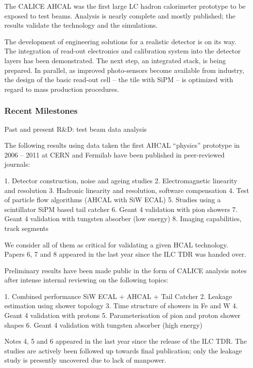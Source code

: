 The CALICE AHCAL was the first large LC hadron calorimeter prototype to be exposed to test beams. Analysis is nearly complete and mostly published; the results validate the technology and the simulations. 

The development of engineering solutions for a realistic detector is on its way. The integration of read-out electronics and calibration system into the detector layers has been demonstrated. The next step, an integrated stack, is being prepared. In parallel, as improved photo-sensors become available from industry, the design of the basic read-out cell -- the tile with SiPM -- is optimized with regard to mass production procedures. 

\subsubsection{Recent Milestones}
Past and present R\&D: test beam data analysis

The following results using data taken the first AHCAL “physics” prototype in 2006 – 2011 at CERN and Fermilab have been published in peer-reviewed journals: 

1.  Detector construction, noise and ageing studies  
2.  Electromagnetic linearity and resolution  
3.  Hadronic linearity and resolution, software compensation   
4.  Test of particle flow algorithms (AHCAL with SiW ECAL)  
5.  Studies using a scintillator SiPM based tail catcher  
6.  Geant 4 validation with pion showers  
7.  Geant 4 validation with tungsten absorber (low energy)  
8.  Imaging capabilities, track segments  

We consider all of them as critical for validating a given HCAL technology. Papers 6, 7 and 8 appeared in the last year since the ILC TDR was handed over. 

Preliminary results have been made public in the form of CALICE analysis notes after intense internal reviewing on the following topics:

1.  Combined performance SiW ECAL + AHCAL + Tail Catcher   
2.  Leakage estimation using shower topology  
3.  Time structure of showers in Fe and W  
4.  Geant 4 validation with protons   
5.  Parameterisation of pion and proton shower shapes 
6.  Geant 4 validation with tungsten absorber (high energy)  

Notes 4, 5 and 6 appeared in the last year since the release of the ILC TDR. The studies are actively been followed up towards final publication; only the leakage study is presently uncovered due to lack of manpower. 

